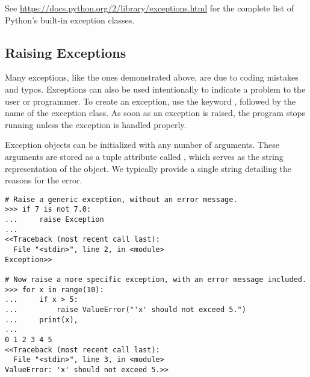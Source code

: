 See \url{https://docs.python.org/2/library/exceptions.html} for the complete list of Python's built-in exception classes.

\subsection*{Raising Exceptions} %

Many exceptions, like the ones demonstrated above, are due to coding mistakes and typos.
Exceptions can also be used intentionally to indicate a problem to the user or programmer.
To create an exception, use the keyword , followed by the name of the exception class.
As soon as an exception is raised, the program stops running unless the exception is handled properly.

Exception objects can be initialized with any number of arguments.
These arguments are stored as a tuple attribute called , which serves as the string representation of the object.
We typically provide a single string detailing the reasons for the error.

\begin{lstlisting}
# Raise a generic exception, without an error message.
>>> if 7 is not 7.0:
...     raise Exception
...
<<Traceback (most recent call last):
  File "<stdin>", line 2, in <module>
Exception>>

# Now raise a more specific exception, with an error message included.
>>> for x in range(10):
...     if x > 5:
...         raise ValueError("'x' should not exceed 5.")
...     print(x),
...
0 1 2 3 4 5
<<Traceback (most recent call last):
  File "<stdin>", line 3, in <module>
ValueError: 'x' should not exceed 5.>>
\end{lstlisting}


